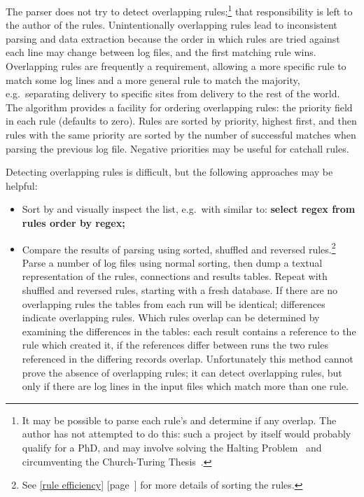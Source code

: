 \documentclass[a4paper,12pt,draft]{article}
\newcommand{\refwithpage}[1]{%
    \empty{}\ref{#1} [page~\pageref{#1}]%
}
\newcommand{\sectionref}[1]{%
    \textsection{}\refwithpage{#1}%
}
\begin{document}
The parser does not try to detect overlapping rules;\footnote{It may be
possible to parse each rule's \regex{} and determine if any overlap.  The
author has not attempted to do this: such a project by itself would
probably qualify for a PhD, and may involve solving the Halting
Problem~\cite{Wikipedia-halting-problem} and circumventing the
Church-Turing Thesis~\cite{Wikipedia-church-turing-thesis}.} that
responsibility is left to the author of the rules.  Unintentionally
overlapping rules lead to inconsistent parsing and data extraction because
the order in which rules are tried against each line may change between log
files, and the first matching rule wins.  Overlapping rules are frequently
a requirement, allowing a more specific rule to match some log lines and a
more general rule to match the majority, e.g.\ separating \SMTP{} delivery
to specific sites from \SMTP{} delivery to the rest of the world.  The
algorithm provides a facility for ordering overlapping rules: the priority
field in each rule (defaults to zero).  Rules are sorted by priority,
highest first, and then rules with the same priority are sorted by the
number of successful matches when parsing the previous log file.  Negative
priorities may be useful for catchall rules.

Detecting overlapping rules is difficult, but the following approaches may
be helpful:

\begin{itemize}

    \item Sort by \regex{} and visually inspect the list, e.g.\ with \SQL{}
        similar to: \textbf{select regex from rules order by regex;}

    \item Compare the results of parsing using sorted, shuffled and
        reversed rules.\footnote{See \sectionref{rule efficiency} for more
        details of sorting the rules.}  Parse a number of log files using
        normal sorting, then dump a textual representation of the rules,
        connections and results tables.  Repeat with shuffled and reversed
        rules, starting with a fresh database.  If there are no overlapping
        rules the tables from each run will be identical; differences
        indicate overlapping rules.  Which rules overlap can be determined
        by examining the differences in the tables: each result contains a
        reference to the rule which created it, if the references differ
        between runs the two rules referenced in the differing records
        overlap.  Unfortunately this method cannot prove the absence of
        overlapping rules; it can detect overlapping rules, but only if
        there are log lines in the input files which match more than one
        rule.

\end{itemize}
\end{document}
